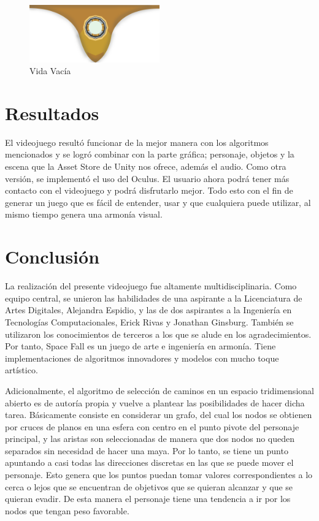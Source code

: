 \documentclass[12pt, conference]{IEEEtran}
\begin{document}
\begin{figure}[h]
\caption{Vida Vac\'{i}a}
\centering
\includegraphics[width=0.5\textwidth]{emptylife}
\end{figure}

\section{Resultados}

El videojuego result\'{o} funcionar de la mejor manera con los algoritmos mencionados y se logr\'{o} combinar con la parte gr\'{a}fica; personaje, objetos y la escena que la Asset Store de Unity nos ofrece, adem\'{a}s el audio. Como otra versi\'{o}n, se implement\'{o} el uso del Oculus. El usuario ahora podr\'{a} tener m\'{a}s contacto con el videojuego y podr\'{a} disfrutarlo mejor. Todo esto con el fin de generar un juego que es f\'{a}cil de entender, usar y que cualquiera puede utilizar, al mismo tiempo genera una armon\'{i}a visual. 

\section{Conclusi\'{o}n}

La realizaci\'{o}n del presente videojuego fue altamente multidisciplinaria. Como equipo central, se unieron las habilidades de una aspirante a la Licenciatura de Artes Digitales, Alejandra Espidio, y las de dos aspirantes a la Ingenier\'{i}a en Tecnolog\'{i}as Computacionales, Erick Rivas y Jonathan Ginsburg. Tambi\'{e}n se utilizaron los conocimientos de terceros a los que se alude en los agradecimientos. Por tanto, Space Fall es un juego de arte e ingenier\'{i}a en armon\'{i}a. Tiene implementaciones de algoritmos innovadores y modelos con mucho toque art\'{i}stico.

Adicionalmente, el algoritmo de selecci\'{o}n de caminos en un espacio tridimensional abierto es de autor\'{i}a propia y vuelve a plantear las posibilidades de hacer dicha tarea. B\'{a}sicamente consiste en considerar un grafo, del cual los nodos se obtienen por cruces de planos en una esfera con centro en el punto pivote del personaje principal, y las aristas son seleccionadas de manera que dos nodos no queden separados sin necesidad de hacer una maya. Por lo tanto, se tiene un punto apuntando a casi todas las direcciones discretas en las que se puede mover el personaje. Esto genera que los puntos puedan tomar valores correspondientes a lo cerca o lejos que se encuentran de objetivos que se quieran alcanzar y que se quieran evadir. De esta manera el personaje tiene una tendencia a ir por los nodos que tengan peso favorable.
\end{document}
